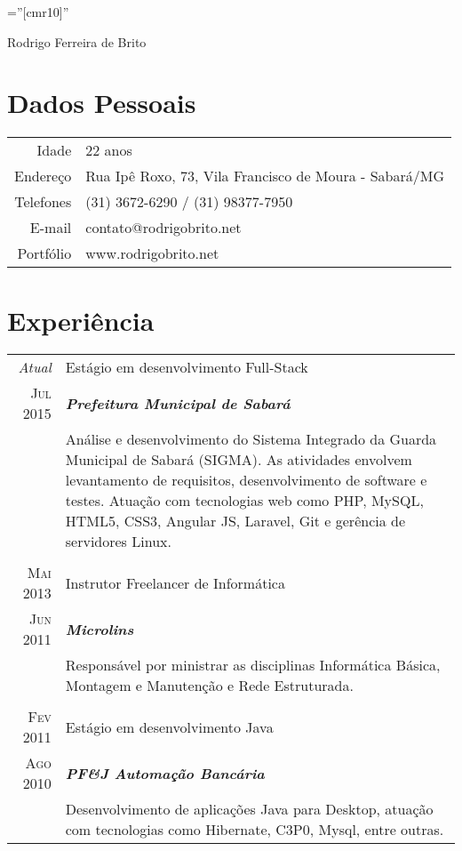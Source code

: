 \documentclass[a4paper,10pt]{article}
\begin{document}
\pagestyle{empty} %

\font\fb=''[cmr10]'' %

\par{\centering
	{\Huge Rodrigo Ferreira de Brito
}\bigskip\par}

\section{Dados Pessoais}

\begin{tabular}{rl}
Idade & 22 anos\\
Endereço & Rua Ipê Roxo, 73, Vila Francisco de Moura - Sabará/MG\\    
Telefones & (31) 3672-6290 / (31) 98377-7950\\
E-mail & contato@rodrigobrito.net\\
Portfólio & www.rodrigobrito.net\\
\end{tabular}

\section{Experiência}
\begin{tabular}{r|p{11cm}}
	\emph{Atual} & Estágio em desenvolvimento Full-Stack \\
	\textsc{Jul 2015}&\emph{\textbf{Prefeitura Municipal de Sabará}}\\
		 &\footnotesize{Análise e desenvolvimento do Sistema Integrado da Guarda Municipal de Sabará (SIGMA). As atividades envolvem levantamento de requisitos, desenvolvimento de software e testes. Atuação com tecnologias web como PHP, MySQL, HTML5, CSS3, Angular JS, Laravel, Git e gerência de servidores Linux.}\\
	\multicolumn{2}{c}{} \\
	\textsc{Mai 2013} & Instrutor Freelancer de Informática \\
		 \textsc{Jun 2011}&\emph{\textbf{Microlins}}\\
		 &\footnotesize{Responsável por ministrar as disciplinas Informática Básica, Montagem e Manutenção e Rede Estruturada.}\\
	\multicolumn{2}{c}{} \\
	\textsc{Fev 2011} & Estágio em desenvolvimento Java\\
		\textsc{Ago 2010}&\emph{\textbf{PF\&J Automação Bancária}}\\
		& \footnotesize{Desenvolvimento de aplicações Java para Desktop, atuação com tecnologias como Hibernate, C3P0, Mysql, entre outras.}
\end{tabular}
\end{document}
